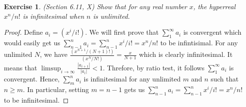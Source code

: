 \documentclass[a4paper, 11pt, openany]{book}
\theoremstyle{plain}
\newtheorem{exercise}{Exercise}[chapter]
\theoremstyle{plain}
\newcommand{\arr}{\rightarrow}
\begin{document}
  \begin{exercise}
    (Section 6.11, X)
     Show that for any real number $x$, the hyperreal $x^n/n!$ is infinitesimal when $n$ is unlimited.
  \end{exercise}
  \begin{proof}
    Define $a_i=(x^i/i!)$. We will first prove that $\sum_{1}^\infty a_i$ is convergent which would easily get us $\sum_{n-1}^n a_i= \sum_{n-1}^n x^i/i!=x^n/n!$ to be infintisimal. For any unlimited $N$, we have $\frac{(x^{N+1}/(N+1)!)}{(x^N/N!)}=\frac{x}{N+1}$ which is clearly infinitesimal. It means that $\limsup_{i \arr \infty} \frac{|a_{i+1}|}{|a_i|}<1$. Threfore, by ratio test, it follows $\sum_{1}^{\infty} a_i$ is convergent. Hence, $\sum_{m}^n a_i$ is infinitesimal for any unlimited $m$ and $n$ such that $n \geq m$. In particular, setting $m=n-1$ gets us $\sum_{n-1}^n a_i= \sum_{n-1}^n x^i/i!=x^n/n!$ to be infinitesimal. 
  \end{proof}
\end{document}
